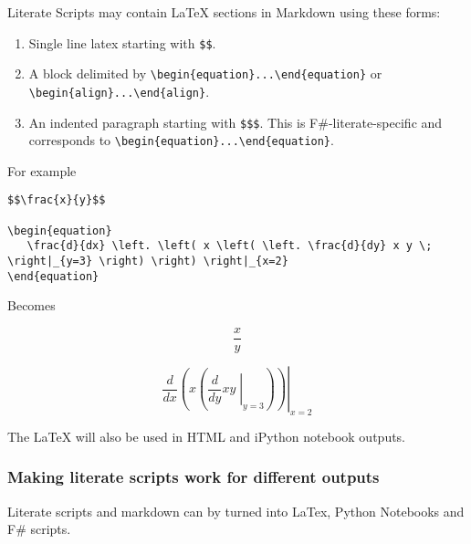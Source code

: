 \documentclass{article}
\begin{document}
Literate Scripts may contain LaTeX sections in Markdown using these forms:
\begin{enumerate}
\item 

Single line latex starting with \texttt{\$\$}.

\item 

A block delimited by \texttt{{\textbackslash}begin\{equation\}...{\textbackslash}end\{equation\}} or \texttt{{\textbackslash}begin\{align\}...{\textbackslash}end\{align\}}.

\item 

An indented paragraph starting with \texttt{\$\$\$}.  This is F\#-literate-specific and corresponds to
\texttt{{\textbackslash}begin\{equation\}...{\textbackslash}end\{equation\}}.

\end{enumerate}



For example
\begin{lstlisting}
$$\frac{x}{y}$$

\begin{equation}
   \frac{d}{dx} \left. \left( x \left( \left. \frac{d}{dy} x y \; \right|_{y=3} \right) \right) \right|_{x=2}
\end{equation}

\end{lstlisting}


Becomes


\begin{equation}
\frac{x}{y}
\end{equation}




\begin{equation}
   \frac{d}{dx} \left. \left( x \left( \left. \frac{d}{dy} x y \; \right|_{y=3} \right) \right) \right|_{x=2}
\end{equation}




The LaTeX will also be used in HTML and iPython notebook outputs.
\subsubsection*{Making literate scripts work for different outputs}



Literate scripts and markdown can by turned into LaTex, Python Notebooks and F\# scripts.
\end{document}
